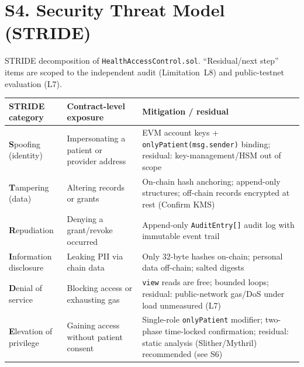 \documentclass[10pt]{article}
\newcommand{\conf}{\textcolor{orange!80!black}{Confirm}}
\begin{document}
\section*{S4. Security Threat Model (STRIDE)}
STRIDE decomposition of \texttt{HealthAccessControl.sol}. ``Residual/next step'' items are scoped to the
independent audit (Limitation~L8) and public-testnet evaluation (L7).
\begin{center}\small
\begin{tabular}{|p{2.3cm}|p{5.4cm}|p{5.4cm}|}
\hline
\textbf{STRIDE category} & \textbf{Contract-level exposure} & \textbf{Mitigation / residual}\\\hline
\textbf{S}poofing (identity) & Impersonating a patient or provider address & EVM account keys + \texttt{onlyPatient(msg.sender)} binding; residual: key-management/HSM out of scope\\\hline
\textbf{T}ampering (data) & Altering records or grants & On-chain hash anchoring; append-only structures; off-chain records encrypted at rest (\conf{} KMS)\\\hline
\textbf{R}epudiation & Denying a grant/revoke occurred & Append-only \texttt{AuditEntry[]} audit log with immutable event trail\\\hline
\textbf{I}nformation disclosure & Leaking PII via chain data & Only 32-byte hashes on-chain; personal data off-chain; salted digests\\\hline
\textbf{D}enial of service & Blocking access or exhausting gas & \texttt{view} reads are free; bounded loops; residual: public-network gas/DoS under load unmeasured (L7)\\\hline
\textbf{E}levation of privilege & Gaining access without patient consent & Single-role \texttt{onlyPatient} modifier; two-phase time-locked confirmation; residual: static analysis (Slither/Mythril) recommended (see S6)\\\hline
\end{tabular}
\end{center}
\end{document}
